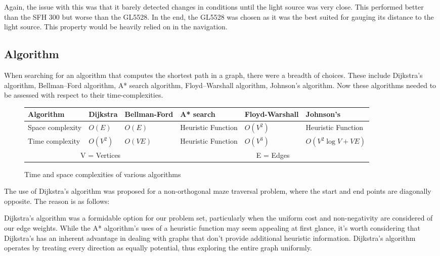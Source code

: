 Again, the issue with this was that it barely detected changes in conditions until the light source was very close. This performed better than the SFH 300 but worse than the GL5528. In the end, the GL5528 was chosen as it was the best suited for gauging its distance to the light source. This property would be heavily relied on in the navigation.

\subsection{Algorithm}

When searching for an algorithm that computes the shortest path in a graph,  there were a breadth of choices. These include Dijkstra's algorithm, Bellman–Ford algorithm, A* search algorithm, Floyd–Warshall algorithm, Johnson's algorithm. Now these algorithms needed to be assessed with respect to their time-complexities.
\begin{figure}
    \centering
    \begin{tabular}{ | p{2cm} | p{2cm} | p{2cm} | p{2cm} | p{2cm} | p{2cm} |}

        \hline
        Algorithm           & Dijkstra     & Bellman-Ford & A* search          & Floyd-Warshall & Johnson's           \\
        \hline
        Space complexity    & \(O(E)\)       & \(O(E)\)       & Heuristic Function & \(O(V^2)\)       & Heuristic Function  \\
        \hline
        Time complexity     & \(O(V^2)\)     & \(O(VE)\)      & Heuristic Function & \(O(V^3)\)       & \(O(V^2 \log V + VE)\) \\
        \hline
        \multicolumn{3}{|c|}{V = Vertices} & \multicolumn{3}{c|}{E = Edges} \\
        \hline
    \end{tabular}
    \caption{Time and space complexities of various algorithms}
    \label{tbl:algorithm-complexities}
\end{figure}

The use of Dijkstra's algorithm was proposed for a non-orthogonal maze traversal problem, where the start and end points are diagonally opposite. The reason is as follows:

Dijkstra's algorithm was a formidable option for our problem set, particularly when the uniform cost and non-negativity are considered of our edge weights. While the A* algorithm's uses of a heuristic function may seem appealing at first glance, it’s worth considering that Dijkstra’s has an inherent advantage in dealing with graphs that don't provide additional heuristic information. Dijkstra's algorithm operates by treating every direction as equally potential, thus exploring the entire graph uniformly.


